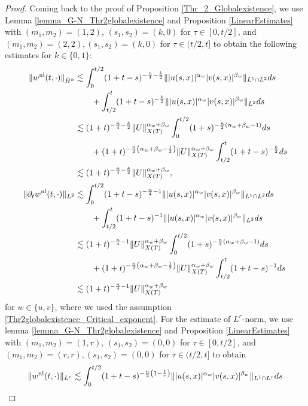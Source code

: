 \documentclass[11pt,reqno]{amsart}
\newcommand{\tron}[1]{\left(#1\right)}
\begin{document}
\begin{proof}
		Coming back to the proof of Proposition \ref{Thr_2_Globalexistence}, we use Lemma \ref{lemma_G-N_Thr2globalexistence} and Proposition \ref{LinearEstimates} with $(m_1,m_2)=(1,2)$, $(s_1, s_2) =(k,0)$ for $\tau \in [0, t/2]$, and $(m_1,m_2)=(2,2), (s_1,s_2) =(k,0)$ for $\tau \in (t/2,t]$ to obtain the following estimates for $k\in \{0,1\}$:
		\begin{align}
			\| w^{\rm nl}(t,\cdot)\|_{\dot{H}^k} &\lesssim \int_0^{t/2} (1+t-s)^{-\frac{n}{4}-\frac{k}{2}} \||u(s,x)|^{\alpha_w}|v(s,x)|^{\beta_w}\|_{L^1\cap L^2}ds\nonumber\\
			&\qquad + \int_{t/2}^t (1+t-s)^{-\frac{k}{2}} \||u(s,x)|^{\alpha_w}|v(s,x)|^{\beta_w}\|_{L^2}ds\nonumber\\
			&\lesssim  (1+t)^{-\frac{n}{4}-\frac{k}{2}} \|U\|_{X(T)}^{\alpha_w+\beta_w} \int_0^{t/2}(1+s)^{-\frac{n}{2}\tron{\alpha_w+\beta_w-1}}ds\nonumber\\
			&\qquad +  (1+t)^{-\frac{n}{2}\tron{\alpha_w+\beta_w-\frac{1}{2}}} \|U\|_{X(T)}^{\alpha_w+\beta_w} \int_{t/2}^t (1+t-s)^{-\frac{k}{2}}ds \nonumber\\
			&\lesssim (1+t)^{-\frac{n}{4}-\frac{k}{2}} \|U\|_{X(T)}^{\alpha_w+\beta_w}, \label{eq_H_2_Thr2} \\     
			\|\partial_t w^{\rm nl}(t,\cdot)\|_{L^2} &\lesssim \int_0^{t/2} (1+t-s)^{-\frac{n}{4}-1} \||u(s,x)|^{\alpha_w}|v(s,x)|^{\beta_w}\|_{L^1\cap L^2}ds\nonumber\\
			&\qquad + \int_{t/2}^t (1+t-s)^{-1} \||u(s,x)|^{\alpha_w}|v(s,x)|^{\beta_w}\|_{L^2}ds\nonumber\\
			&\lesssim  (1+t)^{-\frac{n}{4}-1} \|U\|_{X(T)}^{\alpha_w+\beta_w} \int_0^{t/2}(1+s)^{-\frac{n}{2}\tron{\alpha_w+\beta_w-1}}ds\nonumber\\
			&\qquad +  (1+t)^{-\frac{n}{2}\tron{\alpha_w+\beta_w-\frac{1}{2}}} \|U\|_{X(T)}^{\alpha_w+\beta_w} \int_{t/2}^t (1+t-s)^{-1}ds \nonumber\\
			&\lesssim (1+t)^{-\frac{n}{4}-1} \|U\|_{X(T)}^{\alpha_w+\beta_w} \label{eq_partial_t_Thr2}
		\end{align}
		for $w\in\{u,v\}$, where we used the assumption \eqref{Thr2globalexistence_Critical_exponent}. For the estimate of $L^r$-norm, we use lemma \ref{lemma_G-N_Thr2globalexistence} and Proposition \ref{LinearEstimates} with $(m_1,m_2)=(1,r)$, $(s_1, s_2) =(0,0)$ for $\tau \in [0, t/2]$, and $(m_1,m_2)=(r,r), (s_1,s_2) =(0,0)$ for $\tau \in (t/2,t]$ to obtain
		\begin{align}
			\| w^{\rm nl}(t,\cdot)\|_{L^r} &\lesssim \int_0^{t/2} (1+t-s)^{-\frac{n}{2}\tron{1-\frac{1}{r}}} \||u(s,x)|^{\alpha_w}|v(s,x)|^{\beta_w}\|_{L^1\cap L^r}ds\nonumber\\

\end{align}
\end{proof}
\end{document}
